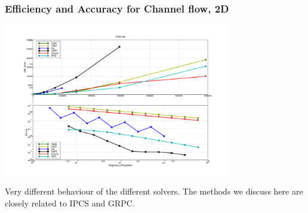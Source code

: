 \begin{frame}
\frametitle{Efficiency and Accuracy for Channel flow, 2D}
 \begin{center}
 \includegraphics[width=10cm]{pdf/new_channel_res.pdf}
 \end{center}
Very different behaviour of the different solvers. 
The methods we discuss here are closely related 
to IPCS and GRPC.  

\end{frame}

